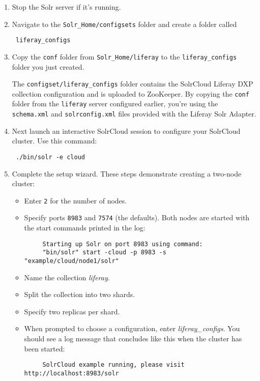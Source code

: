 \begin{enumerate}
\def\labelenumi{\arabic{enumi}.}
\item
  Stop the Solr server if it's running.
\item
  Navigate to the \texttt{Solr\_Home/configsets} folder and create a
  folder called

\begin{verbatim}
 liferay_configs
\end{verbatim}
\item
  Copy the \texttt{conf} folder from \texttt{Solr\_Home/liferay} to the
  \texttt{liferay\_configs} folder you just created.

  The \texttt{configset/liferay\_configs} folder contains the SolrCloud
  Liferay DXP collection configuration and is uploaded to ZooKeeper. By
  copying the \texttt{conf} folder from the \texttt{liferay} server
  configured earlier, you're using the \texttt{schema.xml} and
  \texttt{solrconfig.xml} files provided with the Liferay Solr Adapter.
\item
  Next launch an interactive SolrCloud session to configure your
  SolrCloud cluster. Use this command:

\begin{verbatim}
 ./bin/solr -e cloud
\end{verbatim}
\item
  Complete the setup wizard. These steps demonstrate creating a two-node
  cluster:

  \begin{itemize}
  \item
    Enter \texttt{2} for the number of nodes.
  \item
    Specify ports \texttt{8983} and \texttt{7574} (the defaults). Both
    nodes are started with the start commands printed in the log:

\begin{verbatim}
     Starting up Solr on port 8983 using command:
     "bin/solr" start -cloud -p 8983 -s "example/cloud/node1/solr"
\end{verbatim}
  \item
    Name the collection \emph{liferay}.
  \item
    Split the collection into two shards.
  \item
    Specify two replicas per shard.
  \item
    When prompted to choose a configuration, enter
    \emph{liferay\_configs}. You should see a log message that concludes
    like this when the cluster has been started:

\begin{verbatim}
     SolrCloud example running, please visit http://localhost:8983/solr
\end{verbatim}
  \end{itemize}
\end{enumerate}

